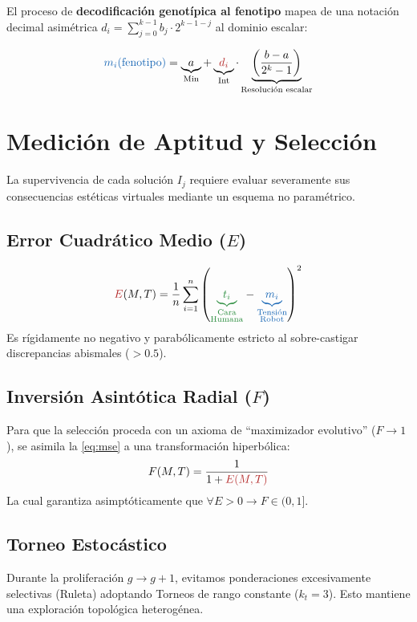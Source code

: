\documentclass[11pt, a4paper, twocolumn]{article}
\begin{document}
El proceso de \textbf{decodificación genotípica al fenotipo} mapea de una notación decimal asimétrica $d_i = \sum_{j=0}^{k-1} b_j \cdot 2^{k-1-j}$ al dominio escalar:

\begin{equation}
\textcolor{coreblue}{m_{i}(\text{fenotipo})} = \underbrace{a}_{\text{Min}} + \underbrace{\textcolor{corered}{d_i}}_{\text{Int}} \cdot \underbrace{\left(\frac{b-a}{2^k-1}\right)}_{ \text{Resolución escalar}}
\end{equation}


\section{Medición de Aptitud y Selección}

La supervivencia de cada solución $I_j$ requiere evaluar severamente sus consecuencias estéticas virtuales mediante un esquema no paramétrico.

\subsection{Error Cuadrático Medio ($E$)}
\begin{equation}
\textcolor{corered}{E}(M, T) = \frac{1}{n} \sum_{i=1}^{n} \left( \textcolor{coregreen}{\underbrace{t_i}_{\substack{\text{Cara}\\\text{Humana}}}} - \textcolor{coreblue}{\underbrace{m_i}_{\substack{\text{Tensión}\\\text{Robot}}}} \right)^2 \label{eq:mse}
\end{equation}
Es rígidamente no negativo y parabólicamente estricto al sobre-castigar discrepancias abismales ($> 0.5$).

\subsection{Inversión Asintótica Radial ($F$)}
Para que la selección proceda con un axioma de ``maximizador evolutivo'' ($F \to 1$), se asimila la \autoref{eq:mse} a una transformación hiperbólica:
\begin{equation}
    F(M, T) = \frac{\textcolor{black}{1}}{\textcolor{black}{1} + \textcolor{corered}{E(M,T)}}
\end{equation}
La cual garantiza asimptóticamente que $\forall E > 0 \rightarrow F \in (0,1]$.

\subsection{Torneo Estocástico}
Durante la proliferación $g \to g+1$, evitamos ponderaciones excesivamente selectivas (Ruleta) adoptando Torneos de rango constante ($k_t = 3$). Esto mantiene una exploración topológica heterogénea.
\end{document}
